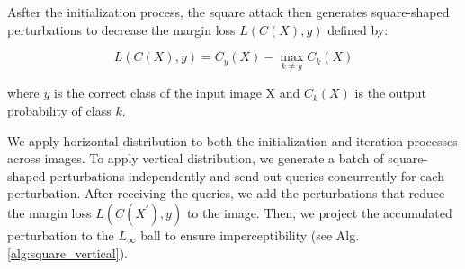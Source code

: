 Asfter the initialization process, the square attack then generates square-shaped perturbations to decrease the margin loss $L(C(X), y)$ defined by:

$$ L(C(X), y)= C_y(X)-\max_{k \neq y}C_k(X)$$

where $y$ is the correct class of the input image X and $C_k(X)$ is the output probability of class $k$.

We apply horizontal distribution to both the initialization and iteration processes across images. To apply vertical distribution, we generate a batch of square-shaped perturbations independently and send out queries concurrently for each perturbation. After receiving the queries, we add the perturbations that reduce the margin loss $L(C(X^{'}), y)$ to the image. Then, we project the accumulated perturbation to the $L_\infty$ ball to ensure imperceptibility (see Alg. \ref{alg:square_vertical}).


